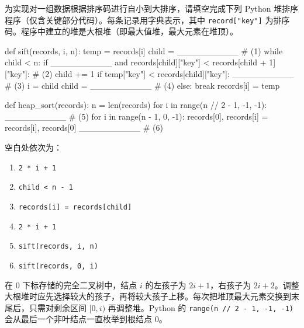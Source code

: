 \begin{question}[堆排序]
为实现对一组数据根据排序码进行自小到大排序，请填空完成下列 Python 堆排序程序（仅含关键部分代码）。每条记录用字典表示，其中 \texttt{record["key"]} 为排序码。程序中建立的堆是大根堆（即最大值堆，最大元素在堆顶）。
\begin{pycode}
def sift(records, i, n):
    temp = records[i]
    child = __________                         # (1)
    while child < n:
        if __________ and records[child]["key"] < records[child + 1]["key"]: # (2)
            child += 1
        if temp["key"] < records[child]["key"]:
            __________                         # (3)
            i = child
            child = __________                 # (4)
        else:
            break
    records[i] = temp


def heap_sort(records):
    n = len(records)
    for i in range(n // 2 - 1, -1, -1):
        __________                             # (5)
    for i in range(n - 1, 0, -1):
        records[0], records[i] = records[i], records[0]
        __________                             # (6)
\end{pycode}
\begin{solution}
空白处依次为：
\begin{enumerate}
  \item \texttt{2 * i + 1}
  \item \texttt{child < n - 1}
  \item \texttt{records[i] = records[child]}
  \item \texttt{2 * i + 1}
  \item \texttt{sift(records, i, n)}
  \item \texttt{sift(records, 0, i)}
\end{enumerate}
在 $0$ 下标存储的完全二叉树中，结点 $i$ 的左孩子为 $2i+1$，右孩子为 $2i+2$。调整大根堆时应先选择较大的孩子，再将较大孩子上移。每次把堆顶最大元素交换到末尾后，只需对剩余区间 $[0,i)$ 再调整堆。Python 的 \texttt{range(n // 2 - 1, -1, -1)} 会从最后一个非叶结点一直枚举到根结点 $0$。
\end{solution}
\end{question}


